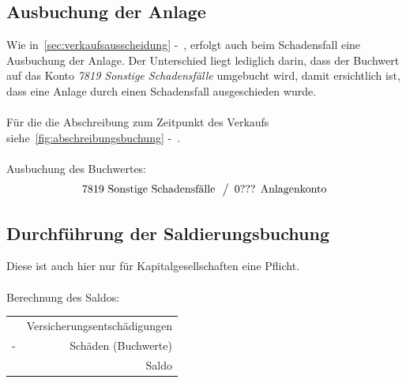 \documentclass[a4paper,10pt]{report}
\begin{document}
\subsection{Ausbuchung der Anlage}
Wie in~\autoref{sec:verkaufsausscheidung}
-~, erfolgt auch beim Schadensfall
eine Ausbuchung der Anlage. Der Unterschied liegt lediglich darin,
dass der Buchwert auf das Konto \textit{7819 Sonstige Schadensfälle}
umgebucht wird, damit ersichtlich ist, dass eine Anlage durch einen
Schadensfall ausgeschieden wurde.\\
\\
Für die die Abschreibung zum Zeitpunkt des Verkaufs
siehe~\autoref{fig:abschreibungsbuchung}
-~.\\
\\
Ausbuchung des Buchwertes:
\begin{equation*}
  \begin{array}{l}
    \text{7819 Sonstige Schadensfälle}\\
  \end{array}
  \left\slash
    \begin{array}{l}
      \text{0??? Anlagenkonto}\\
    \end{array}
  \right.
\end{equation*}

\subsection{}

\subsection{Durchführung der Saldierungsbuchung}
Diese ist auch hier nur für Kapitalgesellschaften eine
Pflicht.\\
\\Berechnung des Saldos:
\begin{table}[h]
  \centering
  \begin{tabular}{l r}
    & Versicherungsentschädigungen\\
    - & Schäden (Buchwerte)\\
    \hline
    & Saldo
  \end{tabular}
\end{table}
\end{document}
